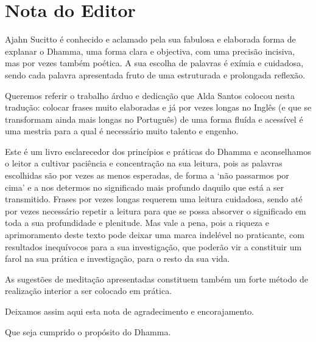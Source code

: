 \chapter{Nota do Editor}

Ajahn Sucitto é conhecido e aclamado pela sua fabulosa e elaborada forma de
explanar o Dhamma, uma forma clara e objectiva, com uma precisão incisiva, mas
por vezes também poética. A sua escolha de palavras é exímia e cuidadosa, sendo
cada palavra apresentada fruto de uma estruturada e prolongada reflexão.

Queremos referir o trabalho árduo e dedicação que Alda Santos colocou nesta
tradução: colocar frases muito elaboradas e já por vezes longas no Inglês (e que
se transformam ainda mais longas no Português) de uma forma fluída e acessível é
uma mestria para a qual é necessário muito talento e engenho.

Este é um livro esclarecedor dos princípios e práticas do Dhamma e aconselhamos
o leitor a cultivar paciência e concentração na sua leitura, pois as palavras
escolhidas são por vezes as menos esperadas, de forma a `não passarmos por cima'
e a nos determos no significado mais profundo daquilo que está a ser
transmitido. Frases por vezes longas requerem uma leitura cuidadosa, sendo até
por vezes necessário repetir a leitura para que se possa absorver o significado
em toda a sua profundidade e plenitude. Mas vale a pena, pois a riqueza e
aprimoramento deste texto pode deixar uma marca indelével no praticante, com
resultados inequívocos para a sua investigação, que poderão vir a constituir um
farol na sua prática e investigação, para o resto da sua vida.

As sugestões de meditação apresentadas constituem também um forte método de
realização interior a ser colocado em prática.

Deixamos assim aqui esta nota de agradecimento e encorajamento.

Que seja cumprido o propósito do Dhamma.
